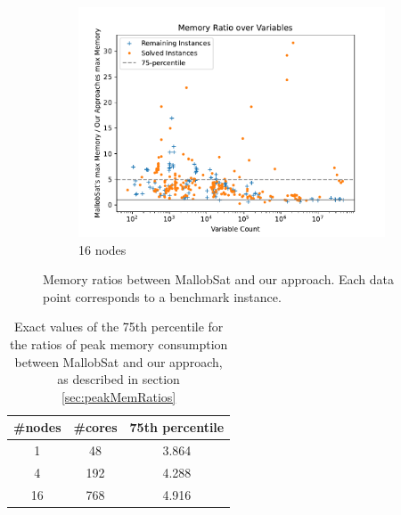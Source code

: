 \documentclass[12pt,a4paper,twoside]{scrartcl}
\numberwithin{equation}{section}
\begin{document}
\begin{figure}[!h]
\begin{subfigure}[c]{.45\textwidth}
    \includegraphics[scale=.45]{plots/16node_compare/mem_ratio_over_vars.pdf}
    \caption{16 nodes}
    \label{fig:memRatiosVars16node}
  \end{subfigure}
  \caption{Memory ratios between MallobSat and our approach. Each data point corresponds to a benchmark instance.}
  \label{fig:memRatiosVars}
\end{figure}

\begin{table}[!h]
  \center
  \begin{tabular}{ ccc }
    \toprule
    \#nodes & \#cores & 75th percentile \\
    \midrule
    1  & 48  & 3.864\\
    4  & 192 & 4.288\\
    16 & 768 & 4.916\\
    \bottomrule
  \end{tabular}
  \caption{Exact values of the 75th percentile for the ratios of peak memory consumption between MallobSat and our approach, as described in section \ref{sec:peakMemRatios}}
  \label{tab:memRatioPercentiles}
\end{table}
\end{document}
